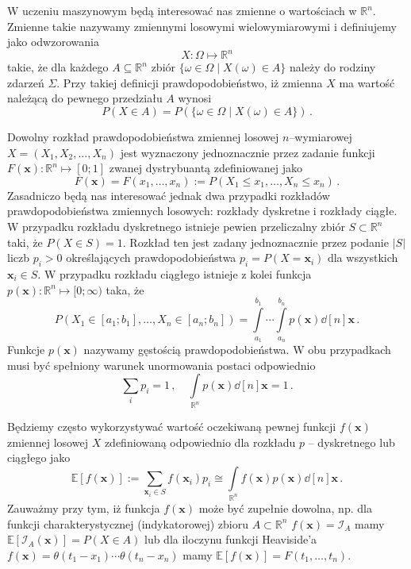\documentclass{myclass}
\begin{document}
W uczeniu maszynowym będą interesować nas zmienne o wartościach w \(\mathbb{R}^n\). Zmienne takie
nazywamy zmiennymi losowymi wielowymiarowymi i definiujemy jako odwzorowania
\begin{equation*}
    X: \Omega \mapsto \mathbb{R}^n
\end{equation*}
takie, że dla każdego \(A \subseteq \mathbb{R}^n\) zbiór \(\{\omega \in \Omega \mid X(\omega) \in
A\}\) należy do rodziny zdarzeń \(\Sigma\). Przy takiej definicji prawdopodobieństwo, iż zmienna
\(X\) ma wartość należącą do pewnego przedziału \(A\) wynosi
\begin{equation*}
    P(X \in A) = P(\{\omega \in \Omega \mid X(\omega) \in A\})\,.
\end{equation*}

Dowolny rozkład prawdopodobieństwa zmiennej losowej \(n\)--wymiarowej \(X = (X_1, X_2, \ldots,
X_n)\) jest wyznaczony jednoznacznie przez zadanie funkcji \(F(\mathbf{x}): \mathbb{R}^n \mapsto
[0;1]\) zwanej dystrybuantą zdefiniowanej jako
\begin{equation*}
    F(\mathbf{x}) = F(x_1, \ldots, x_n) := P(X_1 \leq x_1, \ldots, X_n \leq x_n)\,.
\end{equation*}
Zasadniczo będą nas interesować jednak dwa przypadki rozkładów prawdopodobieństwa zmiennych
losowych: rozkłady dyskretne i rozkłady ciągłe. W przypadku rozkładu dyskretnego istnieje pewien
przeliczalny zbiór \(S \subset \mathbb{R}^n\) taki, że \(P(X \in S) = 1\). Rozkład ten jest zadany
jednoznacznie przez podanie \(|S|\) liczb \(p_i > 0\) określających prawdopodobieństwa \(p_i = P(X =
\mathbf{x}_i)\) dla wszystkich \(\mathbf{x}_i \in S\). W przypadku rozkładu ciągłego istnieje z
kolei funkcja \(p(\mathbf{x}): \mathbb{R}^n \mapsto [0; \infty)\) taka, że
\begin{equation*}
    P(X_1 \in [a_1; b_1], \ldots, X_n \in [a_n; b_n]) = \int\limits_{a_1}^{b_1}\cdots\int\limits_{a_n}^{b_n}p(\mathbf{x})\dd[n]{\mathbf{x}}\,.
\end{equation*}
Funkcje \(p(\mathbf{x})\) nazywamy gęstością prawdopodobieństwa. W obu przypadkach musi być
spełniony warunek unormowania postaci odpowiednio
\begin{equation*}
    \sum_i p_i = 1\,,\quad \int\limits_{\mathbb{R}^n}p(\mathbf{x})\dd[n]{\mathbf{x}} = 1\,.
\end{equation*}

Będziemy często wykorzystywać wartość oczekiwaną pewnej funkcji \(f(\mathbf{x})\) zmiennej losowej
\(X\) zdefiniowaną odpowiednio dla rozkładu \(p\) -- dyskretnego lub ciągłego jako
\begin{equation*}
    \mathbb{E}[f(\mathbf{x})] := \sum_{\mathbf{x}_i \in S} f(\mathbf{x}_i)p_i \cong \int\limits_{\mathbb{R}^n}f(\mathbf{x})p(\mathbf{x})\dd[n]{\mathbf{x}}\,.
\end{equation*}
Zauważmy przy tym, iż funkcja \(f(\mathbf{x})\) może być zupełnie dowolna, np. dla funkcji
charakterystycznej (indykatorowej) zbioru \(A \subset \mathbb{R}^n\) \(f(\mathbf{x}) =
\mathcal{I}_A\) mamy \(\mathbb{E}[\mathcal{I}_A(\mathbf{x})] = P(X \in A)\) lub dla iloczynu funkcji
Heaviside'a \(f(\mathbf{x}) = \theta(t_1 - x_1)\cdots\theta(t_n - x_n)\) mamy
\(\mathbb{E}[f(\mathbf{x})] = F(t_1,\ldots, t_n)\).
\end{document}
